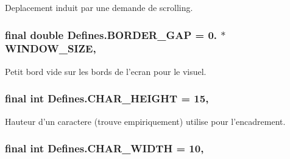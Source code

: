 Deplacement induit par une demande de scrolling. 

\hypertarget{classDefines_ae1cb2849525afcbee188dd5681a29f2f}{
\subsubsection[{B\-O\-R\-D\-E\-R\-\_\-\-G\-A\-P}]{\setlength{\rightskip}{0pt plus 5cm}final double Defines.\-B\-O\-R\-D\-E\-R\-\_\-\-G\-A\-P = 0. $\ast$ {\bf W\-I\-N\-D\-O\-W\-\_\-\-S\-I\-Z\-E}\hspace{0.3cm}{\ttfamily [static]}, {\ttfamily [package]}}}\label{classDefines_ae1cb2849525afcbee188dd5681a29f2f}


Petit bord vide sur les bords de l'ecran pour le visuel. 

\hypertarget{classDefines_aefdb64aa2941d347830f576d61bd941f}{
\subsubsection[{C\-H\-A\-R\-\_\-\-H\-E\-I\-G\-H\-T}]{\setlength{\rightskip}{0pt plus 5cm}final int Defines.\-C\-H\-A\-R\-\_\-\-H\-E\-I\-G\-H\-T = 15\hspace{0.3cm}{\ttfamily [static]}, {\ttfamily [package]}}}\label{classDefines_aefdb64aa2941d347830f576d61bd941f}


Hauteur d'un caractere (trouve empiriquement) utilise pour l'encadrement. 

\hypertarget{classDefines_a35af074df13dcc76204831f1910d2353}{
\subsubsection[{C\-H\-A\-R\-\_\-\-W\-I\-D\-T\-H}]{\setlength{\rightskip}{0pt plus 5cm}final int Defines.\-C\-H\-A\-R\-\_\-\-W\-I\-D\-T\-H = 10\hspace{0.3cm}{\ttfamily [static]}, {\ttfamily [package]}}}\label{classDefines_a35af074df13dcc76204831f1910d2353}


